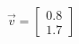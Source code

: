 \documentclass[preview]{standalone}
\begin{document}
\begin{align*}
\vec{v}=\begin{bmatrix}0.8\\1.7\end{bmatrix}
\end{align*}
\end{document}

